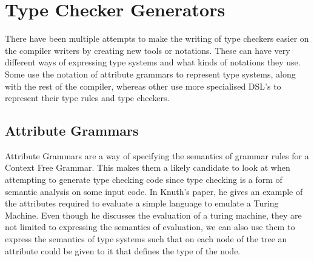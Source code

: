 \section{Type Checker Generators}
There have been multiple attempts to make the writing of type checkers easier on the compiler writers by creating new tools or notations.
These can have very different ways of  expressing type systems and what kinds of notations they use.
Some use the notation of attribute grammars to represent type systems, along with the rest of the compiler, whereas other use more specialised DSL's to represent their type rules and type checkers.

\subsection{Attribute Grammars}
Attribute Grammars are a way of specifying the semantics of grammar rules for a Context Free Grammar.
This makes them a likely candidate to look at when attempting to generate type checking code since type checking is a form of semantic analysis on some input code.
In Knuth's paper\cite{Knuth1968}, he gives an example of the attributes required to evaluate a simple language to emulate a Turing Machine.
Even though he discusses the evaluation of a turing machine, they are not limited to expressing the semantics of evaluation, we can also use them to express the semantics of type systems such that on each node of the tree an attribute could be given to it that defines the type of the node.

